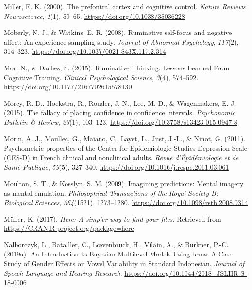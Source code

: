 \documentclass[a4paper,12pt,twoside,openright,oldfontcommands]{memoir}
\begin{document}
\leavevmode\hypertarget{ref-miller_prefontral_2000}{}%
Miller, E. K. (2000). The prefontral cortex and cognitive control. \emph{Nature Reviews Neuroscience}, \emph{1}(1), 59--65. \url{https://doi.org/10.1038/35036228}

\leavevmode\hypertarget{ref-Moberly2008}{}%
Moberly, N. J., \& Watkins, E. R. (2008). Ruminative self-focus and negative affect: An experience sampling study. \emph{Journal of Abnormal Psychology}, \emph{117}(2), 314--323. \url{https://doi.org/10.1037/0021-843X.117.2.314}

\leavevmode\hypertarget{ref-mor_ruminative_2015}{}%
Mor, N., \& Daches, S. (2015). Ruminative Thinking: Lessons Learned From Cognitive Training. \emph{Clinical Psychological Science}, \emph{3}(4), 574--592. \url{https://doi.org/10.1177/2167702615578130}

\leavevmode\hypertarget{ref-morey_fallacy_2015}{}%
Morey, R. D., Hoekstra, R., Rouder, J. N., Lee, M. D., \& Wagenmakers, E.-J. (2015). The fallacy of placing confidence in confidence intervals. \emph{Psychonomic Bulletin \& Review}, \emph{23}(1), 103--123. \url{https://doi.org/10.3758/s13423-015-0947-8}

\leavevmode\hypertarget{ref-morin_psychometric_2011}{}%
Morin, A. J., Moullec, G., Maïano, C., Layet, L., Just, J.-L., \& Ninot, G. (2011). Psychometric properties of the Center for Epidemiologic Studies Depression Scale (CES-D) in French clinical and nonclinical adults. \emph{Revue d'Épidémiologie et de Santé Publique}, \emph{59}(5), 327--340. \url{https://doi.org/10.1016/j.respe.2011.03.061}

\leavevmode\hypertarget{ref-moulton_imagining_2009}{}%
Moulton, S. T., \& Kosslyn, S. M. (2009). Imagining predictions: Mental imagery as mental emulation. \emph{Philosophical Transactions of the Royal Society B: Biological Sciences}, \emph{364}(1521), 1273--1280. \url{https://doi.org/10.1098/rstb.2008.0314}

\leavevmode\hypertarget{ref-R-here}{}%
Müller, K. (2017). \emph{Here: A simpler way to find your files}. Retrieved from \url{https://CRAN.R-project.org/package=here}

\leavevmode\hypertarget{ref-nalborczyk_introduction_2019}{}%
Nalborczyk, L., Batailler, C., Lœvenbruck, H., Vilain, A., \& Bürkner, P.-C. (2019a). An Introduction to Bayesian Multilevel Models Using brms: A Case Study of Gender Effects on Vowel Variability in Standard Indonesian. \emph{Journal of Speech Language and Hearing Research}. \url{https://doi.org/10.1044/2018_JSLHR-S-18-0006}
\end{document}
